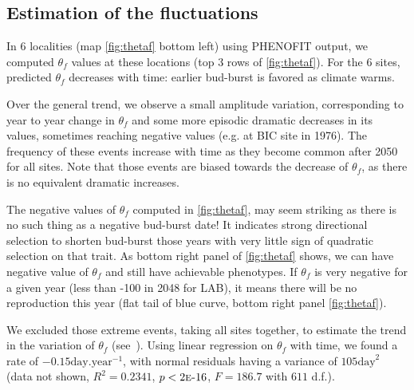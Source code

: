\subsection*{Estimation of the fluctuations}

In 6 localities (map \autoref{fig:thetaf} bottom left) using \textsc{PHENOFIT} output, we computed $\theta_f$ values at these locations (top 3 rows of \autoref{fig:thetaf}). For the 6 sites, predicted $\theta_f$ decreases with time: earlier bud-burst is favored as climate warms.

Over the general trend, we observe a small amplitude variation, corresponding to year to year change in $\theta_f$ and some more episodic dramatic decreases in its values, sometimes reaching negative values (e.g. at BIC site in 1976). The frequency of these events increase with time as they become common after 2050 for all sites. Note that those events are biased towards the decrease of $\theta_f$, as there is no equivalent dramatic increases.

The negative values of $\theta_f$ computed in \autoref{fig:thetaf}, may seem striking as there is no such thing as a negative bud-burst date! It indicates strong directional selection to shorten bud-burst those years with very little sign of quadratic selection on that trait. As bottom right panel of \autoref{fig:thetaf} shows, we can have negative value of $\theta_f$ and still have achievable phenotypes. If $\theta_f$ is very negative for a given year (less than -100 in 2048 for LAB), it means there will be no reproduction this year (flat tail of blue curve, bottom right panel \autoref{fig:thetaf}).

We excluded those extreme events, taking all sites together, to estimate the trend in the variation of $\theta_f$ (see~). Using linear regression on $\theta_f$ with time, we found a rate of $-0.15 \text{day}.\text{year}^{-1}$, with normal residuals having a variance of $105 \text{day}^2$ (data not shown, $R^2=0.2341$, $p<2\text{\sc{e}-}16$, $F=186.7$ with $611$ d.f.).

